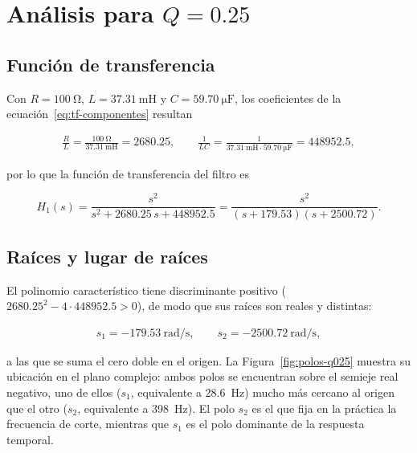 \chapter{Análisis para $Q = \num{0.25}$}
\label{chap:q025}

\section{Función de transferencia}

Con $R = \qty{100}{\ohm}$, $L = \qty{37.31}{\milli\henry}$ y $C = \qty{59.70}{\micro\farad}$, los
coeficientes de la ecuación~\eqref{eq:tf-componentes} resultan

\begin{gather*}
  \frac{R}{L} = \frac{\qty{100}{\ohm}}{\qty{37.31}{\milli\henry}} = \num{2680.25}, \qquad
  \frac{1}{LC} = \frac{1}{\qty{37.31}{\milli\henry} \cdot \qty{59.70}{\micro\farad}} = \num{448952.5},
\end{gather*}

por lo que la función de transferencia del filtro es

\begin{equation}
  H_1(s) = \frac{s^2}{s^2 + \num{2680.25}\, s + \num{448952.5}}
         = \frac{s^2}{\left(s + \num{179.53}\right)\left(s + \num{2500.72}\right)}.
  \label{eq:tf-q025}
\end{equation}

\section{Raíces y lugar de raíces}

El polinomio característico tiene discriminante positivo
($\num{2680.25}^2 - 4 \cdot \num{448952.5} > 0$), de modo que sus raíces son reales y distintas:

\begin{gather*}
  s_1 = \num{-179.53}\ \unit{\radian\per\second}, \qquad
  s_2 = \num{-2500.72}\ \unit{\radian\per\second},
\end{gather*}

a las que se suma el cero doble en el origen. La Figura~\ref{fig:polos-q025} muestra su ubicación en el
plano complejo: ambos polos se encuentran sobre el semieje real negativo, uno de ellos
($s_1$, equivalente a \qty{28.6}{\hertz}) mucho más cercano al origen que el otro
($s_2$, equivalente a \qty{398}{\hertz}). El polo $s_2$ es el que fija en la práctica la frecuencia de corte,
mientras que $s_1$ es el polo dominante de la respuesta temporal.


